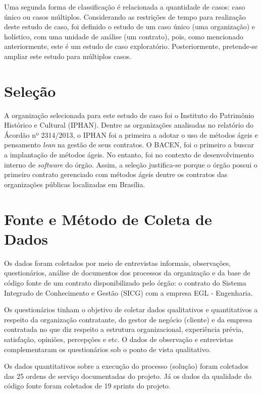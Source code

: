 Uma segunda forma de classificação é relacionada a quantidade de casos: caso único ou casos múltiplos. Considerando as restrições de tempo para realização deste estudo de caso, foi definido o estudo de um caso único (uma organização) e holístico, com uma unidade de análise (um contrato), pois, como mencionado anteriormente, este é um estudo de caso exploratório. Posteriormente, pretende-se ampliar este estudo para múltiplos casos.   

\section[Seleção]{Seleção}

A organização selecionada para este estudo de caso foi o Instituto do Patrimônio Histórico e Cultural (IPHAN). Dentre as organizações analisadas no relatório do Ácordão nº 2314/2013, o IPHAN foi a primeira a adotar o uso de métodos ágeis e pensamento \textit{lean} na gestão de seus contratos. O BACEN, foi o primeiro a buscar a implantação de métodos ágeis. No entanto, foi no contexto de desenvolvimento interno de \textit{software} do órgão. Assim, a seleção justifica-se porque o órgão possui o primeiro contrato gerenciado com métodos ágeis dentre os contratos das organizações públicas localizadas em Brasília.

\section[Fonte e Método Coleta de Dados]{Fonte e Método de Coleta de Dados}

Os dados foram coletados por meio de entrevistas informais, observações, questionários, análise de documentos dos processos da organização e da base de código fonte de um contrato disponibilizado pelo órgão: o contrato do Sistema Integrado de Conhecimento e Gestão (SICG) com a empresa EGL - Engenharia.

Os questionários tinham o objetivo de coletar dados qualitativos e quantitativos a respeito da organização contratante, do gestor de negócio (cliente) e da empresa contratada no que diz respeito a estrutura organizacional, experiência prévia, satisfação, opiniões, percepções e etc. O dados de observação e entrevistas complementaram os questionários sob o ponto de vista qualitativo.

Os dados quantitativos sobre a execução do processo (solução) foram coletados das 25 ordens de serviço documentadas do projeto. Já os dados da qualidade do código fonte foram coletados de 19 sprints do projeto.

